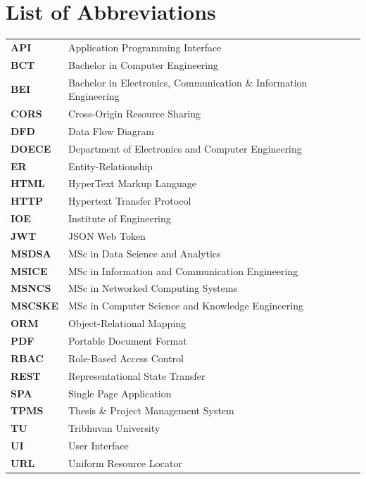 \documentclass[12pt]{report}
\begin{document}
\chapter*{List of Abbreviations}
\begin{tabular}{p{2.5cm} l}
\textbf{API}      & Application Programming Interface\\
\textbf{BCT}      & Bachelor in Computer Engineering\\
\textbf{BEI}      & Bachelor in Electronics, Communication \& Information Engineering\\
\textbf{CORS}     & Cross-Origin Resource Sharing\\
\textbf{DFD}      & Data Flow Diagram\\
\textbf{DOECE}    & Department of Electronics and Computer Engineering\\
\textbf{ER}       & Entity-Relationship\\
\textbf{HTML}     & HyperText Markup Language\\
\textbf{HTTP}     & Hypertext Transfer Protocol\\
\textbf{IOE}      & Institute of Engineering\\
\textbf{JWT}      & JSON Web Token\\
\textbf{MSDSA}    & MSc in Data Science and Analytics\\
\textbf{MSICE}    & MSc in Information and Communication Engineering\\
\textbf{MSNCS}    & MSc in Networked Computing Systems\\
\textbf{MSCSKE}   & MSc in Computer Science and Knowledge Engineering\\
\textbf{ORM}      & Object-Relational Mapping\\
\textbf{PDF}      & Portable Document Format\\
\textbf{RBAC}     & Role-Based Access Control\\
\textbf{REST}     & Representational State Transfer\\
\textbf{SPA}      & Single Page Application\\
\textbf{TPMS}     & Thesis \& Project Management System\\
\textbf{TU}       & Tribhuvan University\\
\textbf{UI}       & User Interface\\
\textbf{URL}      & Uniform Resource Locator\\
\end{tabular}
\end{document}
